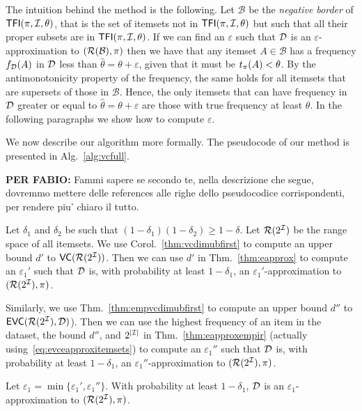 The intuition behind the method is the following. Let $\mathcal{B}$ be the
\emph{negative border} of $\mathsf{TFI}(\pi,{\cal I},\theta)$, that is the set of itemsets
not in $\mathsf{TFI}(\pi,{\cal I},\theta)$ but such that all their proper subsets are in
$\mathsf{TFI}(\pi,{\cal I},\theta)$. If we can find an $\varepsilon$ such that ${\cal D}$ is an
$\varepsilon$-approximation to $(\mathcal{R}(\mathcal{B}),\pi)$ then we have that any
itemset $A\in\mathcal{B}$ has a frequency $f_{\cal D}(A)$ in ${\cal D}$ less than
$\hat{\theta}=\theta+\varepsilon$, given that it must be $t_\pi(A)<\theta$. By
the antimonotonicity property of the frequency, the same holds for all itemsets
that are supersets of those in $\mathcal{B}$. Hence, the only itemsets that can
have frequency in ${\cal D}$ greater or equal to $\hat{\theta}=\theta+\varepsilon$
are those with true frequency at least $\theta$. In the following paragraphs we
show how to compute $\varepsilon$.

We now describe our algorithm more formally. The pseudocode of our method is
presented in Alg.~\ref{alg:vcfull}.

{\bf PER FABIO: } Fammi sapere se secondo te, nella descrizione che segue,
dovremmo mettere delle references alle righe dello pseudocodice corrispondenti,
per rendere piu' chiaro il tutto.

Let $\delta_1$ and $\delta_2$ be such that $(1-\delta_1)(1-\delta_2)\ge
1-\delta$. Let $\mathcal{R}(2^{\cal I})$ be the range space of all itemsets.
We use Corol.~\ref{thm:vcdimubfirst} to compute an upper bound $d'$ to
$\mathsf{VC}(\mathcal{R}(2^{\cal I}))$. Then we can use $d'$ in Thm.~\ref{thm:eapprox} to compute
an $\varepsilon_1'$ such that ${\cal D}$ is, with probability at least $1-\delta_1$,
an $\varepsilon_1'$-approximation to $(\mathcal{R}(2^{\cal I}),\pi)$.

Similarly, we use Thm.~\ref{thm:empvcdimubfirst} to compute an upper bound $d''$
to $\mathsf{EVC}(\mathcal{R}(2^{\cal I}),{\cal D})$). Then we can use the highest frequency of an item
in the dataset, the bound $d''$, and $2^{|{\cal I}|}$ in Thm.~\ref{thm:eapproxempir}
(actually using~\eqref{eq:evceapproxitemsets}) to compute an $\varepsilon_1''$
such that ${\cal D}$ is, with probability at least $1-\delta_1$, an
$\varepsilon_1''$-approximation to $(\mathcal{R}(2^{\cal I}),\pi)$.

\begin{fact}
Let $\varepsilon_1=\min\{\varepsilon_1',\varepsilon_1''\}$. With probability at
least $1-\delta_1$, ${\cal D}$ is an $\varepsilon_1$-approximation to
$(\mathcal{R}(2^{\cal I}),\pi)$.
\end{fact}

